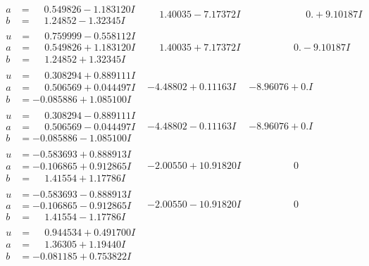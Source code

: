 \documentclass[1p]{elsarticle_modified}
\theoremstyle{definition}
\begin{document}
$$\begin{array}{c|c|c}
\begin{aligned}
a &= \phantom{-}0.549826 - 1.183120 I \\
b &= \phantom{-}1.24852 - 1.32345 I\end{aligned}
 & \phantom{-}1.40035 - 7.17372 I & \phantom{-0.000000 -}0. + 9.10187 I \\ \hline\begin{aligned}
u &= \phantom{-}0.759999 - 0.558112 I \\
a &= \phantom{-}0.549826 + 1.183120 I \\
b &= \phantom{-}1.24852 + 1.32345 I\end{aligned}
 & \phantom{-}1.40035 + 7.17372 I & \phantom{-0.000000 } 0. - 9.10187 I \\ \hline\begin{aligned}
u &= \phantom{-}0.308294 + 0.889111 I \\
a &= \phantom{-}0.506569 + 0.044497 I \\
b &= -0.085886 + 1.085100 I\end{aligned}
 & -4.48802 + 0.11163 I & -8.96076 + 0. I\phantom{ +0.000000I} \\ \hline\begin{aligned}
u &= \phantom{-}0.308294 - 0.889111 I \\
a &= \phantom{-}0.506569 - 0.044497 I \\
b &= -0.085886 - 1.085100 I\end{aligned}
 & -4.48802 - 0.11163 I & -8.96076 + 0. I\phantom{ +0.000000I} \\ \hline\begin{aligned}
u &= -0.583693 + 0.888913 I \\
a &= -0.106865 + 0.912865 I \\
b &= \phantom{-}1.41554 + 1.17786 I\end{aligned}
 & -2.00550 + 10.91820 I & \phantom{-0.000000 } 0 \\ \hline\begin{aligned}
u &= -0.583693 - 0.888913 I \\
a &= -0.106865 - 0.912865 I \\
b &= \phantom{-}1.41554 - 1.17786 I\end{aligned}
 & -2.00550 - 10.91820 I & \phantom{-0.000000 } 0 \\ \hline\begin{aligned}
u &= \phantom{-}0.944534 + 0.491700 I \\
a &= \phantom{-}1.36305 + 1.19440 I \\
b &= -0.081185 + 0.753822 I\end{aligned}

\end{array}$$
\end{document}

